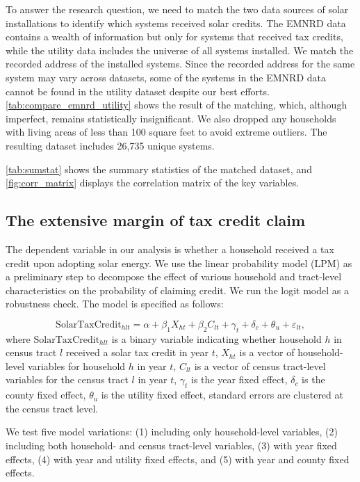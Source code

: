 \documentclass[11pt,twoside,letterpaper]{article}
\begin{document}
To answer the research question, we need to match the two data sources of solar installations to identify which systems received solar credits. The EMNRD data contains a wealth of information but only for systems that received tax credits, while the utility data includes the universe of all systems installed. We match the recorded address of the installed systems. Since the recorded address for the same system may vary across datasets, some of the systems in the EMNRD data cannot be found in the utility dataset despite our best efforts. \autoref{tab:compare_emnrd_utility} shows the result of the matching, which, although imperfect, remains statistically insignificant. We also dropped any households with living areas of less than 100 square feet to avoid extreme outliers. The resulting dataset includes 26,735 unique systems.


\autoref{tab:sumstat} shows the summary statistics of the matched dataset, and \autoref{fig:corr_matrix} displays the correlation matrix of the key variables.




\subsection{The extensive margin of tax credit claim}

The dependent variable in our analysis is whether a household received a tax credit upon adopting solar energy. We use the linear probability model (LPM) as a preliminary step to decompose the effect of various household and tract-level characteristics on the probability of claiming credit. We run the logit model as a robustness check. The model is specified as follows:

\begin{equation}\label{reg_3}
    \text{SolarTaxCredit}_{hlt} = \alpha + \beta_1 X_{ht} + \beta_2 C_{lt}  + \gamma_t +  \delta_c + \theta_u + \varepsilon_{lt},
\end{equation}
where $\text{SolarTaxCredit}_{hlt}$ is a binary variable indicating whether household $h$ in census tract $l$ received a solar tax credit in year $t$, $X_{ht}$ is a vector of household-level variables for household $h$ in year $t$, $C_{lt}$ is a vector of census tract-level variables for the census tract $l$ in year $t$, $\gamma_t$ is the year fixed effect, $\delta_c$ is the county fixed effect, $\theta_u$ is the utility fixed effect, standard errors are clustered at the census tract level.

We test five model variations: (1) including only household-level variables, (2) including both household- and census tract-level variables, (3) with year fixed effects, (4) with year and utility fixed effects, and (5) with year and county fixed effects.
\end{document}
